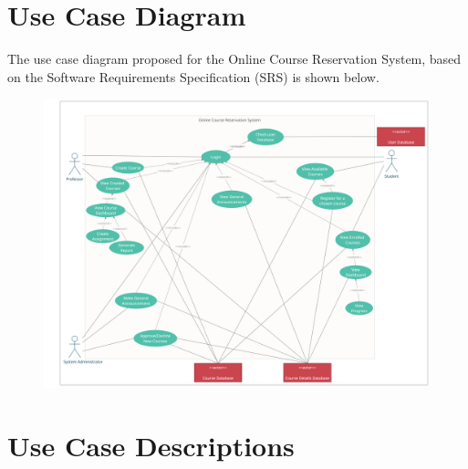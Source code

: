 \documentclass[12pt, a4]{report}
\begin{document}
\maketitle
\newpage
\tableofcontents


\newpage
\chapter{Use Case Diagram}
The use case diagram proposed for the Online Course Reservation System, based on the Software Requirements Specification (SRS) is shown below.
\begin{figure}[h]
    \centering
    \includegraphics[width=\textwidth]{Diagrams/Use Case Diagram.png}
\end{figure}


\newpage
\chapter{Use Case Descriptions}

\end{document}

